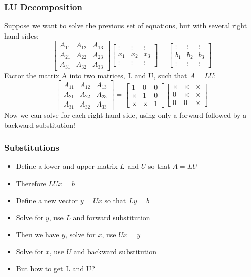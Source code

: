 \documentclass[11pt,table,final,xcolor={usenames,dvipsnames,table}]{beamer}
\begin{document}
\begin{frame}[fragile]
  \frametitle{LU Decomposition}
  Suppose we want to solve the previous set of equations, but with several right hand sides:
    \[ 
    \begin{bmatrix}
A_{11} & A_{12} & A_{13}\\ 
A_{21} & A_{22} & A_{23}\\ 
A_{31} & A_{32} & A_{33}
\end{bmatrix}
\begin{bmatrix}
\vdots & \vdots & \vdots \\
x_1 & x_2 & x_3 \\
\vdots & \vdots & \vdots
\end{bmatrix} = 
\begin{bmatrix}
\vdots & \vdots & \vdots \\
b_1 & b_2 & b_3 \\
\vdots & \vdots & \vdots
\end{bmatrix}
\]\pause
Factor the matrix A into two matrices, L and U, such that $A=LU$:
\[ 
    \begin{bmatrix}
A_{11} & A_{12} & A_{13}\\ 
A_{21} & A_{22} & A_{23}\\ 
A_{31} & A_{32} & A_{33}
\end{bmatrix} = 
\begin{bmatrix}
1 & 0 & 0 \\
\times & 1 & 0 \\
\times & \times & 1
\end{bmatrix}
\begin{bmatrix}
\times & \times & \times \\
0 & \times & \times \\
0 & 0 & \times
\end{bmatrix}
\]
Now we can solve for each right hand side, using only a forward
followed by a backward substitution!
\end{frame}

\begin{frame}[fragile]
  \frametitle{Substitutions}
  \begin{itemize}
    \item Define a lower and upper matrix $L$ and $U$ so that $A = LU$
    \item Therefore $LUx = b$
    \item Define a new vector $y = Ux$ so that $Ly = b$
    \item Solve for $y$, use $L$ and forward substitution
    \item Then we have $y$, solve for $x$, use $Ux = y$
    \item Solve for $x$, use $U$ and backward substitution
    \item But how to get L and U?
  \end{itemize}
\end{frame}
\end{document}
